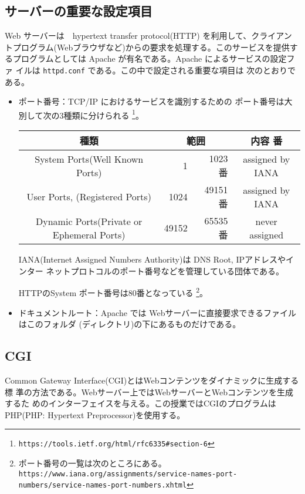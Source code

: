 \subsection{サーバーの重要な設定項目}
Web サーバーは　hypertext transfer protocol(HTTP) を利用して、クライアン
トプログラム(Webブラウザなど)からの要求を処理する。このサービスを提供す
るプログラムとしては Apache が有名である。Apache によるサービスの設定ファ
イルは \texttt{httpd.conf} である。この中で設定される重要な項目は
次のとおりである。
\begin{itemize}
 \item ポート番号：TCP/IP におけるサービスを識別するための
       ポート番号は大別して次の3種類に分けられる
\footnote{\texttt{https://tools.ietf.org/html/rfc6335\#section-6}}。
\begin{center}
 \begin{tabular}{|c|r@{番$\sim$}r<{番}|c|}
\hline
種類 &\multicolumn{2}{c|}{範囲} &内容 \\\hline
  System Ports(Well Known Ports)& 1&1023 & assigned by IANA\\ \hline
  User Ports, (Registered Ports)& 1024&49151 & assigned by IANA\\
  \hline
  Dynamic Ports(Private or Ephemeral Ports)& 49152& 65535&never assigned \\ \hline
 \end{tabular}
\end{center}
IANA(Internet Assigned Numbers Authority)は DNS Root, IPアドレスやインター
       ネットプロトコルのポート番号などを管理している団体である。

       HTTPのSystem ポート番号は80番となっている
\footnote{ポート番号の一覧は次のところにある。\\
%
 \texttt{https://www.iana.org/assignments/}\texttt{service-names-port-numbers/service-names-port-numbers.xhtml}}。


 \item ドキュメントルート：Apache では Webサーバーに直接要求できるファイルはこのフォルダ
       (ディレクトリ)の下にあるものだけである。
\end{itemize}
\subsection{CGI}
Common Gateway Interface(CGI)とはWebコンテンツをダイナミックに生成する標
準の方法である。Webサーバー上ではWebサーバーとWebコンテンツを生成するた
めのインターフェイスを与える。この授業ではCGIのプログラムはPHP(PHP:
Hypertext Preprocessor)を使用する。


